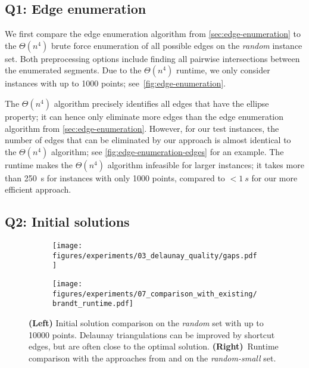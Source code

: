 \subsection{Q1: Edge enumeration}

We first compare the edge enumeration algorithm from \cref{sec:edge-enumeration} to the $\Theta(n^4)$ brute force enumeration of all possible edges on the \emph{random} instance set.
Both preprocessing options include finding all pairwise intersections between the enumerated segments.
Due to the $\Theta(n^4)$ runtime, we only consider instances with up to \num{1000} points; see~\cref{fig:edge-enumeration}.

The $\Theta(n^4)$ algorithm precisely identifies all edges that have the ellipse property;
it can hence only eliminate more edges than the edge enumeration algorithm from \cref{sec:edge-enumeration}.
However, for our test instances, the number of edges that can be eliminated by our approach is almost identical to the $\Theta(n^4)$ algorithm;
see \cref{fig:edge-enumeration-edges} for an example.
The runtime makes the $\Theta(n^4)$ algorithm infeasible for larger instances; 
it takes more than \qty{250}{s} for instances with only \num{1000} points,
compared to $<\qty{1}{s}$ for our more efficient approach.

\subsection{Q2: Initial solutions}
\label{sec:experiments-initial-solutions}

\begin{figure}
    \begin{subfigure}[t]{0.49\linewidth}
        \centering
        \texttt{[image: figures/experiments/03\_delaunay\_quality/gaps.pdf]}        
    \end{subfigure}\hfill
    \begin{subfigure}[t]{0.49\linewidth}
        \centering
        \texttt{[image: figures/experiments/07\_comparison\_with\_existing/brandt\_runtime.pdf]}  
    \end{subfigure}
    \caption{\textbf{(Left)} Initial solution comparison on the \emph{random} set with up to \num{10000} points.
    Delaunay triangulations can be improved by shortcut edges, but are often close to the optimal solution.
    \textbf{(Right)}~Runtime comparison with the approaches from \cite{DBLP:conf/cccg/BrandtGSR14} and \cite{DBLP:journals/jgo/SattariI17} on the \emph{random-small} set.}
    \label{fig:initial-solutions-quality}
    \label{fig:brandt-runtime}
\end{figure}

